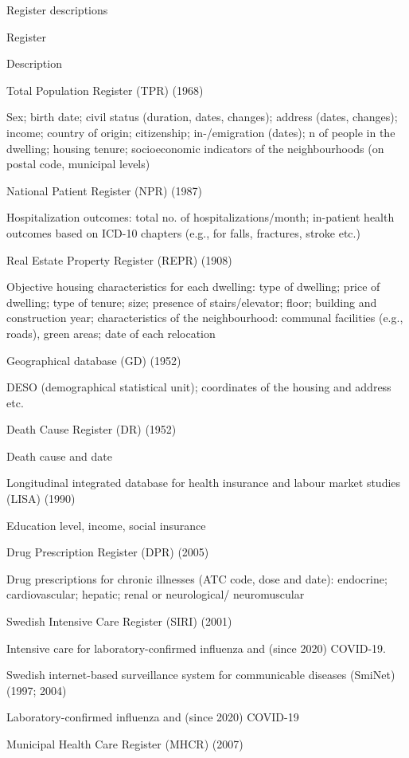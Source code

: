 \documentclass[
]{book}
\begin{document}
\label{tab:unnamed-chunk-3}Register descriptions

Register

Description

Total Population Register (TPR) (1968)

Sex; birth date; civil status (duration, dates, changes); address (dates, changes); income; country of origin; citizenship; in-/emigration (dates); n of people in the dwelling; housing tenure; socioeconomic indicators of the neighbourhoods (on postal code, municipal levels)

National Patient Register (NPR) (1987)

Hospitalization outcomes: total no. of hospitalizations/month; in-patient health outcomes based on ICD-10 chapters (e.g., for falls, fractures, stroke etc.)

Real Estate Property Register (REPR) (1908)

Objective housing characteristics for each dwelling: type of dwelling; price of dwelling; type of tenure; size; presence of stairs/elevator; floor; building and construction year; characteristics of the neighbourhood: communal facilities (e.g., roads), green areas; date of each relocation

Geographical database (GD) (1952)

DESO (demographical statistical unit); coordinates of the housing and address etc.

Death Cause Register (DR) (1952)

Death cause and date

Longitudinal integrated database for health
insurance and labour market studies (LISA) (1990)

Education level, income, social insurance

Drug Prescription Register (DPR) (2005)

Drug prescriptions for chronic illnesses (ATC code, dose and date): endocrine; cardiovascular; hepatic; renal or neurological/ neuromuscular

Swedish Intensive Care Register (SIRI) (2001)

Intensive care for laboratory-confirmed influenza and (since 2020) COVID-19.

Swedish internet-based surveillance system for communicable diseases (SmiNet) (1997; 2004)

Laboratory-confirmed influenza and (since 2020) COVID-19

Municipal Health Care Register (MHCR) (2007)
\end{document}

